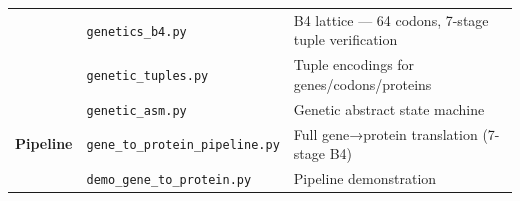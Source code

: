 \begin{longtable}[]{@{}lll@{}}
\begin{minipage}[t]{0.23\columnwidth}
\strut
\end{minipage} & \begin{minipage}[t]{0.26\columnwidth}\raggedright
\texttt{genetics\_b4.py}\strut
\end{minipage} & \begin{minipage}[t]{0.42\columnwidth}\raggedright
B4 lattice --- 64 codons, 7-stage tuple verification\strut
\end{minipage}\tabularnewline
\begin{minipage}[t]{0.23\columnwidth}\raggedright
\strut
\end{minipage} & \begin{minipage}[t]{0.26\columnwidth}\raggedright
\texttt{genetic\_tuples.py}\strut
\end{minipage} & \begin{minipage}[t]{0.42\columnwidth}\raggedright
Tuple encodings for genes/codons/proteins\strut
\end{minipage}\tabularnewline
\begin{minipage}[t]{0.23\columnwidth}\raggedright
\strut
\end{minipage} & \begin{minipage}[t]{0.26\columnwidth}\raggedright
\texttt{genetic\_asm.py}\strut
\end{minipage} & \begin{minipage}[t]{0.42\columnwidth}\raggedright
Genetic abstract state machine\strut
\end{minipage}\tabularnewline
\begin{minipage}[t]{0.23\columnwidth}\raggedright
\textbf{Pipeline}\strut
\end{minipage} & \begin{minipage}[t]{0.26\columnwidth}\raggedright
\texttt{gene\_to\_protein\_pipeline.py}\strut
\end{minipage} & \begin{minipage}[t]{0.42\columnwidth}\raggedright
Full gene→protein translation (7-stage B4)\strut
\end{minipage}\tabularnewline
\begin{minipage}[t]{0.23\columnwidth}\raggedright
\strut
\end{minipage} & \begin{minipage}[t]{0.26\columnwidth}\raggedright
\texttt{demo\_gene\_to\_protein.py}\strut
\end{minipage} & \begin{minipage}[t]{0.42\columnwidth}\raggedright
Pipeline demonstration\strut
\end{minipage}\tabularnewline

\end{longtable}
